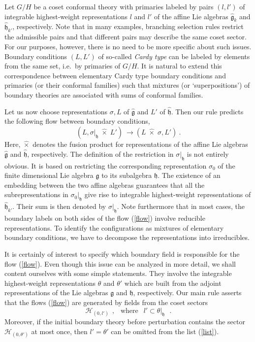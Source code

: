 \documentclass[a4paper,prd,twocolumn,nobibnotes,amssymb,preprintnumbers]{revtex4}
\begin{document}
Let $G/H$ be a coset conformal theory with primaries labeled 
by pairs $(l,l')$ of integrable highest-weight representations 
$l$ and $l'$ of the affine Lie algebras $\hat{\mathfrak{g}}_{k}$ and 
$\hat{\mathfrak{h}}_{k'}$, respectively. Note that in many examples, 
branching selection rules restrict the admissible pairs and 
that different pairs may describe the same coset sector. 
For our purposes, however, there is no need to be more specific 
about such issues. Boundary conditions $(L,L')$ of so-called {\em 
Cardy type} \cite{Cardy:1989ir} can be labeled by elements 
from the same set, i.e.\ by primaries of $G/H$. It is natural 
to extend this correspondence between elementary Cardy type 
boundary conditions and primaries (or their conformal 
families) such that mixtures (or `superpositions') of 
boundary theories are associated with sums of 
conformal families.  

Let us now choose representations $\sigma ,L$ of $\hat{\mathfrak{g}}$ and 
$L'$ of $\hat{\mathfrak{h}}$. Then our rule predicts the following flow 
between boundary conditions, 
\begin{equation}\label{flow}
(L,\sigma |_{\mathfrak{h}}\; \hat{\times}\;  L')\ \longrightarrow (L \; 
\hat{\times} \; \sigma,L')\ .
\end{equation}
Here, $\hat{\times} $ denotes the fusion product for representations of 
the affine Lie algebras $\hat{\mathfrak{g}}$ and $\hat{\mathfrak{h}}$, respectively. 
The definition of the restriction in $\sigma |_{\mathfrak{h}}$ is not entirely 
obvious. It is based on restricting the corresponding representation 
$\sigma_0$ of the finite dimensional Lie algebra $\mathfrak{g}$ to its 
subalgebra $\mathfrak{h}$. The existence of an embedding between the two 
affine algebras guarantees that all the subrepresentations in 
$\sigma_0 |_{\mathfrak{h}}$ give rise to integrable highest-weight 
representations of $\hat {\mathfrak{h}}_{k'}$. Their sum is then denoted 
by $\sigma |_{\mathfrak{h}}$. Note furthermore that in most cases, the 
boundary labels on both sides of the flow (\ref{flow}) involve 
reducible representations. To identify the configurations as 
mixtures of elementary boundary conditions, we have to decompose 
the representations into irreducibles.

It is certainly of interest to specify which boundary field is 
responsible for the flow (\ref{flow}). Even though this issue can 
be analyzed in more detail, we shall content ourselves with some 
simple statements. They involve the integrable highest-weight 
representations $\theta$ and $\theta'$ which are built from the 
adjoint representations of the Lie algebras $\mathfrak{g}$ and $\mathfrak{h}$, 
respectively. Our main rule asserts that the flows (\ref{flow}) 
are generated by fields from the coset sectors 
\begin{equation} \label{list}  
\mathcal{H} _{(0,l')}\ \ , \ \ \mbox{ where } \ \ 
   l' \subset \theta |_{\mathfrak{h}} \ \ \  .   
\end{equation} 
Moreover, if the initial boundary theory before perturbation 
contains the sector $\mathcal{H}_{(0,\theta')}$ at most once, then 
$l' = \theta'$ can be omitted from the list (\ref{list}).   
\end{document}
